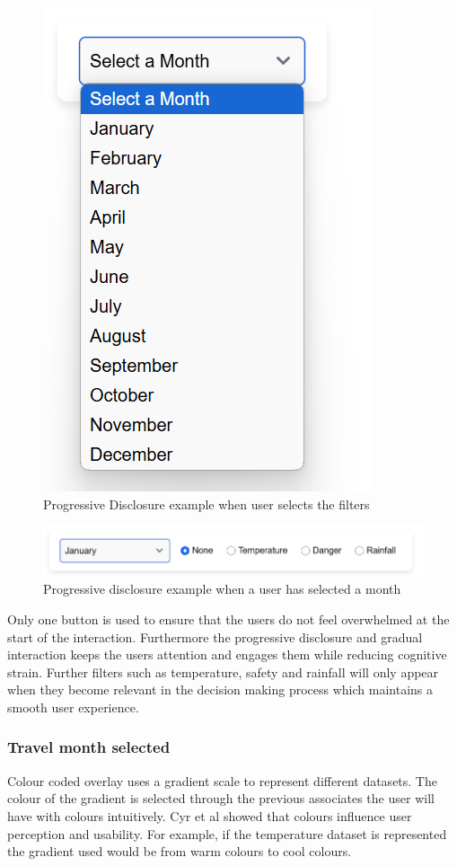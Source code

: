 \documentclass[]{project_final}
\begin{document}
\begin{figure}[ht!]
    \centering
    \includegraphics[width=.5\textwidth]{2.png}
    \caption{Progressive Disclosure example when user selects the filters}
    \label{fig:1}
\end{figure}

\begin{figure}[ht!]
    \centering
    \includegraphics[width=\textwidth]{3.png}
    \caption{Progressive disclosure example when a user has selected a month}
    \label{fig:1}
\end{figure}

Only one button is used to ensure that the users do not feel overwhelmed at the start of the interaction. Furthermore the progressive disclosure and gradual interaction keeps the users attention and engages them while reducing cognitive strain. Further filters such as temperature, safety and rainfall will only appear when they become relevant in the decision making process which maintains a smooth user experience.

\subsubsection{Travel month selected}

Colour coded overlay uses a gradient scale to represent different datasets. The colour of the gradient is selected through the previous associates the user will have with colours intuitively. Cyr et al showed that colours influence user perception and usability. For example, if the temperature dataset is represented the gradient used would be from warm colours to cool colours.
\end{document}
